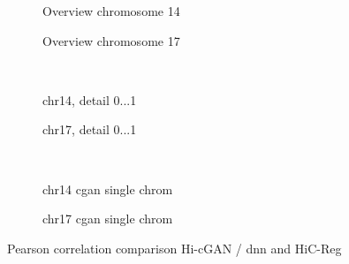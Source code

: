 \begin{figure}[htbp]
 \begin{subfigure}{0.45\textwidth}
  \caption{Overview chromosome 14}\label{fig:results:zhang-vs-ours_pearson_14overview}
 \end{subfigure}\hfill
\begin{subfigure}{0.45\textwidth}
  \caption{Overview chromosome 17}\label{fig:results:zhang-vs-ours_pearson_17overview}
 \end{subfigure}\\[4mm]
 \begin{subfigure}{0.45\textwidth}
  \caption{chr14, detail 0...\SI{1}{\mega\bp}}\label{fig:results:zhang-vs-ours_pearson_14detail}
 \end{subfigure}\hfill
 \begin{subfigure}{0.45\textwidth}
  \caption{chr17, detail 0...\SI{1}{\mega\bp}}\label{fig:results:zhang-vs-ours_pearson_17detail}
 \end{subfigure}\\[4mm]
 \begin{subfigure}{0.45\textwidth}
    \caption{chr14 \acrshort{cgan} single chrom}\label{fig:results:zhang-vs-ours_pearson_14singlechrom}
 \end{subfigure}\hfill
 \begin{subfigure}{0.45\textwidth}
    \caption{chr17 \acrshort{cgan} single chrom}\label{fig:results:zhang-vs-ours_pearson_17singlechrom}
 \end{subfigure}
  \caption{Pearson correlation comparison Hi-cGAN / \acrshort{dnn} and HiC-Reg \cite{Zhang2019}} \label{fig:results:zhang-vs-ours_pearson}
\end{figure}

